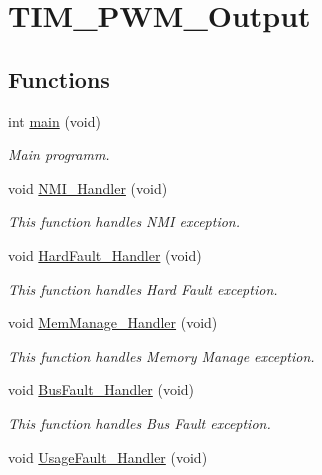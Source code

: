 \hypertarget{group___t_i_m___p_w_m___output}{}\section{T\+I\+M\+\_\+\+P\+W\+M\+\_\+\+Output}
\label{group___t_i_m___p_w_m___output}
\subsection*{Functions}
\begin{DoxyCompactItemize}
\item 
int \hyperlink{group___t_i_m___p_w_m___output_ga840291bc02cba5474a4cb46a9b9566fe}{main} (void)
\begin{DoxyCompactList}\small\item\em Main programm. \end{DoxyCompactList}\item 
void \hyperlink{group___t_i_m___p_w_m___output_ga6ad7a5e3ee69cb6db6a6b9111ba898bc}{N\+M\+I\+\_\+\+Handler} (void)
\begin{DoxyCompactList}\small\item\em This function handles N\+M\+I exception. \end{DoxyCompactList}\item 
void \hyperlink{group___t_i_m___p_w_m___output_ga2bffc10d5bd4106753b7c30e86903bea}{Hard\+Fault\+\_\+\+Handler} (void)
\begin{DoxyCompactList}\small\item\em This function handles Hard Fault exception. \end{DoxyCompactList}\item 
void \hyperlink{group___t_i_m___p_w_m___output_ga3150f74512510287a942624aa9b44cc5}{Mem\+Manage\+\_\+\+Handler} (void)
\begin{DoxyCompactList}\small\item\em This function handles Memory Manage exception. \end{DoxyCompactList}\item 
void \hyperlink{group___t_i_m___p_w_m___output_ga850cefb17a977292ae5eb4cafa9976c3}{Bus\+Fault\+\_\+\+Handler} (void)
\begin{DoxyCompactList}\small\item\em This function handles Bus Fault exception. \end{DoxyCompactList}\item 
void \hyperlink{group___t_i_m___p_w_m___output_ga1d98923de2ed6b7309b66f9ba2971647}{Usage\+Fault\+\_\+\+Handler} (void)

\end{DoxyCompactItemize}
